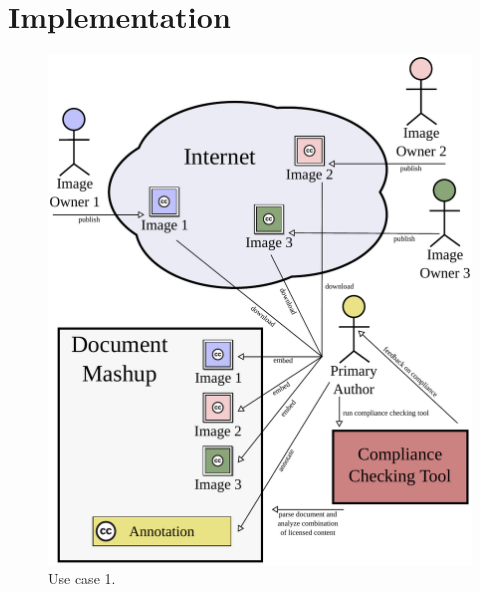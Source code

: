 \documentclass[botnum,fleqn,final]{unmeethesis}
\begin{document}
\chapter{\label{chapter:impl}Implementation}

\begin{figure}[!htpb]
    \begin{center}
        \includegraphics[width=1.0\textwidth]{usecase1-27.pdf}
    \end{center}
  \caption[Use case 1]{Use case 1.}
  \label{fi:usecase1}
\end{figure}
\end{document}
